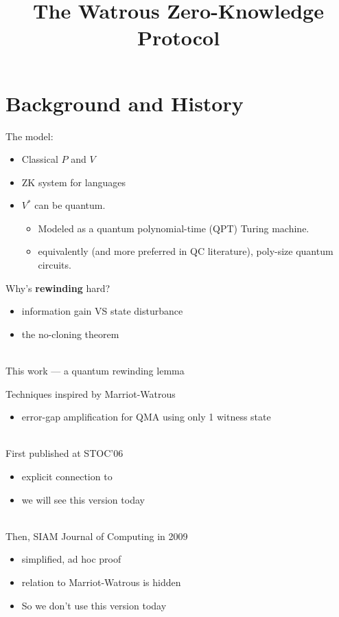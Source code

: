 \documentclass[12pt]{extarticle}
\begin{document}
\title{The Watrous Zero-Knowledge Protocol}

\maketitle

\section{Background and History}



The model:
\begin{itemize}
\item
Classical $P$ and $V$
\item
ZK system for \NP languages
\item
$V^*$ can be quantum. 
\begin{itemize}
\item
Modeled as a quantum polynomial-time (QPT) Turing machine.
\item
equivalently (and more preferred in QC literature), poly-size quantum circuits. 
\end{itemize}
\end{itemize}




Why's {\bf rewinding} hard?
\begin{itemize}
\item
    information gain VS state disturbance
\item
 the no-cloning theorem
\end{itemize}
~\\
This work --- a quantum rewinding lemma 


Techniques inspired by Marriot-Watrous \cite{DBLP:conf/coco/MarriottW04} 
\begin{itemize}
\item error-gap amplification for QMA using only 1 witness state
\end{itemize}
~\\
First published at STOC'06 \cite{DBLP:conf/stoc/Watrous06}
\begin{itemize}
\item
explicit connection to \cite{DBLP:conf/coco/MarriottW04}
\item
we will see this version today
\end{itemize}
~\\
Then, SIAM Journal of Computing in 2009 \cite{DBLP:journals/siamcomp/Watrous09}
\begin{itemize}
\item
simplified, ad hoc proof
\item
relation to Marriot-Watrous is hidden
\item
So we don't use this version today
\end{itemize}






{\fontsize{12pt}{0pt}\selectfont

\newpage



}
\end{document}
